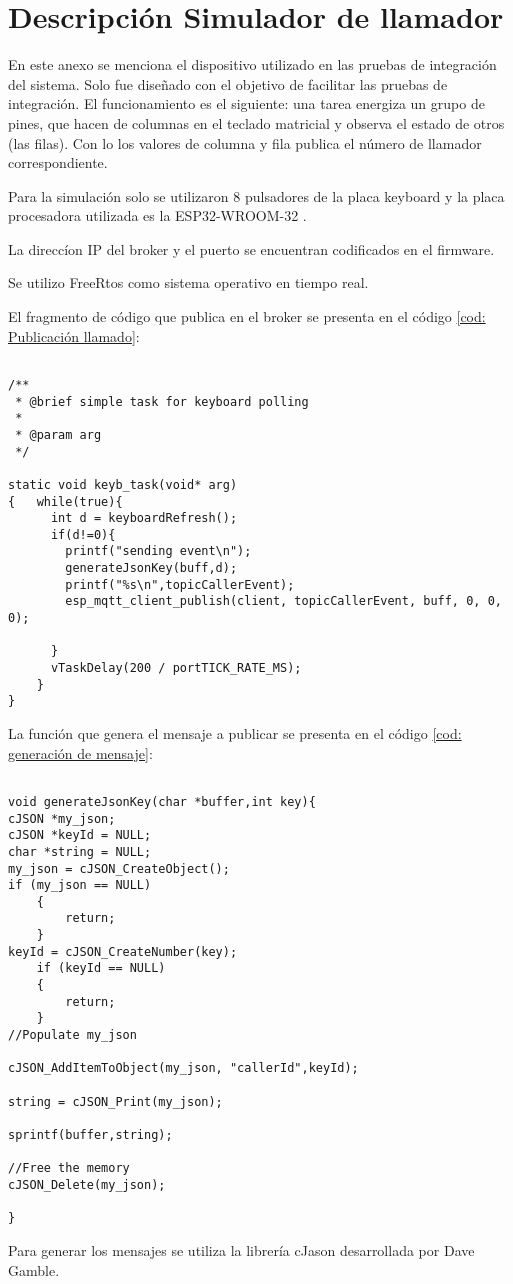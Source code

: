 
\chapter{Descripción Simulador de llamador} %

\label{AppendixA} %

En este anexo se menciona el dispositivo utilizado en las pruebas de integración del sistema. Solo fue diseñado con el objetivo de facilitar las pruebas de integración. El funcionamiento es el siguiente: una tarea energiza un grupo de pines, que hacen de columnas en el teclado matricial y observa el estado de otros (las filas). Con lo los valores de columna y fila publica el número de llamador correspondiente. 

Para la simulación solo se utilizaron 8 pulsadores de la placa keyboard  \citep{WEBSITE:37} y la placa procesadora utilizada es la ESP32-WROOM-32 \citep{WEBSITE:38}. 

La direccíon IP del broker y el puerto se encuentran codificados en el firmware.

Se utilizo FreeRtos \citep{WEBSITE:40} como sistema operativo en tiempo real.

El fragmento de código que publica en el broker se presenta en el código \ref{cod: Publicación llamado}:

\begin{lstlisting}[label=cod: Publicación llamado,caption=Tarea que publica en el broker la simulación de la llamada.]

/**
 * @brief simple task for keyboard polling
 * 
 * @param arg 
 */

static void keyb_task(void* arg)
{   while(true){
      int d = keyboardRefresh();
      if(d!=0){
        printf("sending event\n");
        generateJsonKey(buff,d);
        printf("%s\n",topicCallerEvent);
        esp_mqtt_client_publish(client, topicCallerEvent, buff, 0, 0, 0);

      }
      vTaskDelay(200 / portTICK_RATE_MS);
    }
}
\end{lstlisting}

La función que genera el mensaje a publicar se presenta en el código \ref{cod: generación de mensaje}:

\begin{lstlisting}[label=cod: generación de mensaje,caption= Función que genera el payload.]

void generateJsonKey(char *buffer,int key){
cJSON *my_json;
cJSON *keyId = NULL;
char *string = NULL;    
my_json = cJSON_CreateObject();
if (my_json == NULL)
    {
        return;
    }
keyId = cJSON_CreateNumber(key);
    if (keyId == NULL)
    {
        return;
    }    
//Populate my_json

cJSON_AddItemToObject(my_json, "callerId",keyId);

string = cJSON_Print(my_json);

sprintf(buffer,string);

//Free the memory
cJSON_Delete(my_json);

}

\end{lstlisting}

Para generar los mensajes se utiliza la librería cJason desarrollada por Dave Gamble.